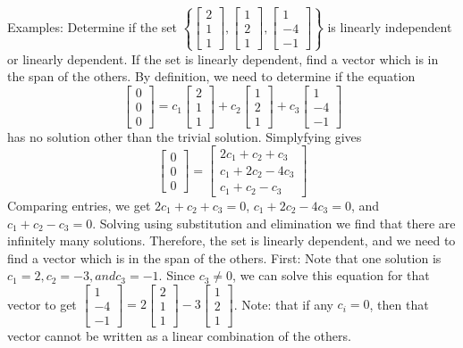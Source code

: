 \documentclass[10pt,letter]{article}
\begin{document}
Examples: Determine if the set $\left\{\begin{bmatrix}2\\1\\1\end{bmatrix},\begin{bmatrix}1\\2\\1\end{bmatrix},\begin{bmatrix}1\\-4\\-1\end{bmatrix}\right\}$ is linearly independent or linearly dependent. If the set is linearly dependent, find a vector which is in the span of the others. By definition, we need to determine if the equation $$\begin{bmatrix}0\\0\\0\end{bmatrix} = c_1\begin{bmatrix}2\\1\\1\end{bmatrix}+c_2\begin{bmatrix}1\\2\\1\end{bmatrix}+c_3\begin{bmatrix}1\\-4\\-1\end{bmatrix}$$ has no solution other than the trivial solution. Simplyfying gives $$\begin{bmatrix}0\\0\\0\end{bmatrix} = \begin{bmatrix}2c_1+c_2+c_3\\c_1+2c_2-4c_3\\c_1+c_2-c_3\end{bmatrix}$$ Comparing entries, we get $2c_1+c_2+c_3 = 0$, $c_1+2c_2-4c_3=0$, and $c_1+c_2-c_3=0$. Solving using substitution and elimination we find that there are infinitely many solutions. Therefore, the set is linearly dependent, and we need to find a vector which is in the span of the others. First: Note that one solution is $c_1=2, c_2=-3, and c_3=-1$. Since $c_3\neq0$, we can solve this equation for that vector to get $\begin{bmatrix}1\\-4\\-1\end{bmatrix} = 2\begin{bmatrix}2\\1\\1\end{bmatrix}-3\begin{bmatrix}1\\2\\1\end{bmatrix}$. Note: that if any $c_i=0$, then that vector cannot be written as a linear combination of the others. \\ 
\end{document}
